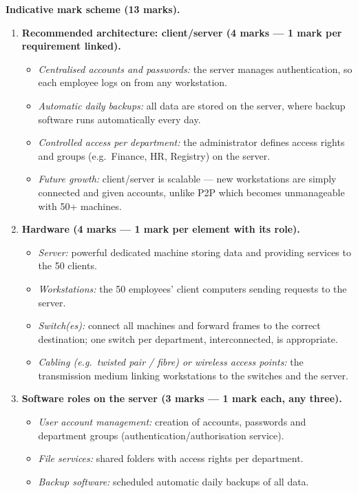 \documentclass[11pt]{article}
\begin{document}
\begin{corrige}
\textbf{Indicative mark scheme (13 marks).}
\begin{enumerate}
\item \textbf{Recommended architecture: client/server (4 marks — 1 mark per requirement linked).}
\begin{itemize}
\item \emph{Centralised accounts and passwords:} the server manages authentication, so each employee logs on from any workstation.
\item \emph{Automatic daily backups:} all data are stored on the server, where backup software runs automatically every day.
\item \emph{Controlled access per department:} the administrator defines access rights and groups (e.g.\ Finance, HR, Registry) on the server.
\item \emph{Future growth:} client/server is scalable — new workstations are simply connected and given accounts, unlike P2P which becomes unmanageable with 50+ machines.
\end{itemize}
\item \textbf{Hardware (4 marks — 1 mark per element with its role).}
\begin{itemize}
\item \emph{Server:} powerful dedicated machine storing data and providing services to the 50 clients.
\item \emph{Workstations:} the 50 employees' client computers sending requests to the server.
\item \emph{Switch(es):} connect all machines and forward frames to the correct destination; one switch per department, interconnected, is appropriate.
\item \emph{Cabling (e.g.\ twisted pair / fibre) or wireless access points:} the transmission medium linking workstations to the switches and the server.
\end{itemize}
\item \textbf{Software roles on the server (3 marks — 1 mark each, any three).}
\begin{itemize}
\item \emph{User account management:} creation of accounts, passwords and department groups (authentication/authorisation service).
\item \emph{File services:} shared folders with access rights per department.
\item \emph{Backup software:} scheduled automatic daily backups of all data.

\end{itemize}
\end{enumerate}
\end{corrige}
\end{document}
